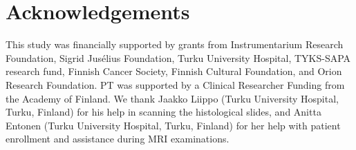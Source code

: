 \section{Acknowledgements}

This study was financially supported by grants from Instrumentarium Research
Foundation, Sigrid Jusélius Foundation, Turku University Hospital, TYKS-SAPA
research fund, Finnish Cancer Society, Finnish Cultural Foundation, and Orion
Research Foundation. PT was supported by a Clinical Researcher Funding from the
Academy of Finland. We thank Jaakko Liippo (Turku University Hospital, Turku,
Finland) for his help in scanning the histological slides, and Anitta Entonen
(Turku University Hospital, Turku, Finland) for her help with patient enrollment
and assistance during MRI examinations.
